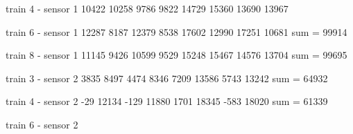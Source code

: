 train 4 - sensor 1
10422
10258
 9786
 9822
14729
15360
13690
13967

train 6 - sensor 1
12287
8187
12379
8538
17602
12990
17251
10681
sum =  99914

train 8 - sensor 1
11145
 9426
10599
 9529
15248
15467
14576
13704
sum = 99695

train 3 - sensor 2
3835
8497
4474
8346
7209
13586
5743
13242
sum = 64932

train 4 - sensor 2
-29
12134
-129
11880
1701
18345
-583
18020
sum =  61339

train 6 - sensor 2
